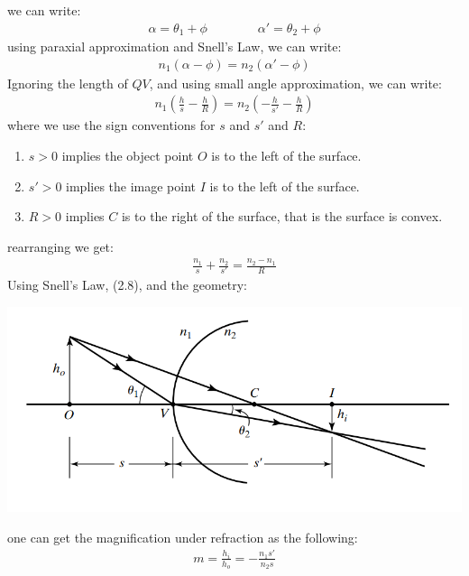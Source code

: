 \documentclass[11pt]{book}
\theoremstyle{break}
\theoremstyle{break}
\begin{document}
we can write:
\begin{align*}
\alpha = \theta_1 + \phi \qquad\qquad \alpha' = \theta_2 + \phi
\end{align*}
using paraxial approximation and Snell's Law, we can write:
\begin{align*}
n_1(\alpha - \phi) = n_2(\alpha' - \phi)
\end{align*}
Ignoring the length of $QV$, and using small angle approximation, we can write:
\begin{align*}
n_1 \left( \frac{h}{s} - \frac{h}{R} \right) = n_2 \left( -\frac{h}{s'} - \frac{h}{R}\right)
\end{align*}
where we use the sign conventions for $s$ and $s'$ and $R$:
\begin{enumerate}[topsep=3pt,itemsep=-1ex,partopsep=1ex,parsep=1ex]
\item $s>0$ implies the object point $O$ is to the left of the surface.
\item $s'>0$ implies the image point $I$ is to the left of the surface.
\item $R>0$ implies $C$ is to the right of the surface, that is the surface is convex.
\end{enumerate}
rearranging we get:
\begin{align}
\frac{n_1}{s} + \frac{n_2}{s'} = \frac{n_2 - n_1}{R}
\end{align}
Using Snell's Law, (2.8), and the geometry: 
\begin{center}
\includegraphics[scale=0.46]{refracMag.png}
\end{center}
one can get the magnification under refraction as the following:
\begin{align*}
m = \frac{h_i}{h_o} = -\frac{n_1 s'}{n_2 s}
\end{align*}



\newpage
\end{document}
